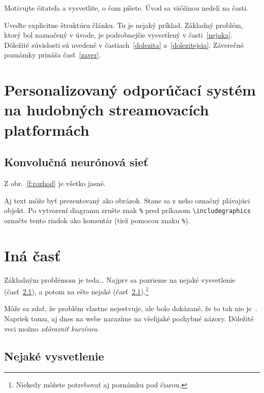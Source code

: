 \documentclass[10pt,twoside,slovak,a4paper, colorinlistoftodos]{article}
\begin{document}
Motivujte čitateľa a vysvetlite, o čom píšete. Úvod sa väčšinou nedelí na časti.

Uveďte explicitne štruktúru článku. Tu je nejaký príklad.
Základný problém, ktorý bol naznačený v úvode, je podrobnejšie vysvetlený v časti~\ref{nejaka}.
Dôležité súvislosti sú uvedené v častiach~\ref{dolezita} a~\ref{dolezitejsia}.
Záverečné poznámky prináša časť~\ref{zaver}.



\section{Personalizovaný odporúčací systém na hudobných streamovacích platformách} \label{1}
\subsection{Konvolučná neurónová sieť} \label{1:1}

Z obr.~\ref{f:rozhod} je všetko jasné. 

\begin{figure*}[tbh]
\centering
Aj text môže byť prezentovaný ako obrázok. Stane sa z neho označný plávajúci objekt. Po vytvorení diagramu zrušte znak \texttt{\%} pred príkazom \verb|\includegraphics| označte tento riadok ako komentár (tiež pomocou znaku \texttt{\%}).
\caption{Rozhodujúci argument.}
\label{f:rozhod}
\end{figure*}



\section{Iná časť} \label{ina}

Základným problémom je teda\ldots{} Najprv sa pozrieme na nejaké vysvetlenie (časť~\ref{ina:nejake}), a potom na ešte nejaké (časť~\ref{ina:nejake}).\footnote{Niekedy môžete potrebovať aj poznámku pod čiarou.}

Môže sa zdať, že problém vlastne nejestvuje\cite{Coplien:MPD}, ale bolo dokázané, že to tak nie je~\cite{Czarnecki:Staged, Czarnecki:Progress}. Napriek tomu, aj dnes na webe narazíme na všelijaké pochybné názory\cite{PLP-Framework}. Dôležité veci možno \emph{zdôrazniť kurzívou}.


\subsection{Nejaké vysvetlenie} \label{ina:nejake}
\end{document}
